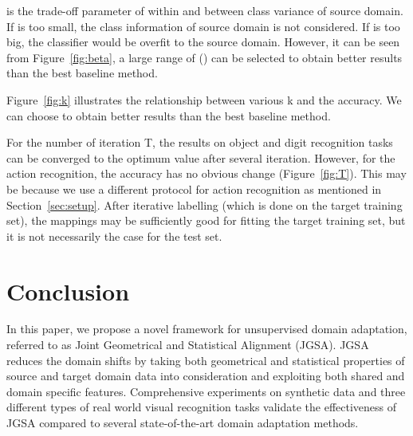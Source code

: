 \documentclass[10pt,twocolumn,letterpaper]{article}
\begin{document}
 is the trade-off parameter of within and between class variance of source domain. If  is too small, the class information of source domain is not considered. If  is too big, the classifier would be overfit to the source domain. However, it can be seen from Figure~\ref{fig:beta}, a large range of  () can be selected to obtain better results than the best baseline method.

Figure~\ref{fig:k} illustrates the relationship between various k and the accuracy.
We can choose  to obtain better results than the best baseline method.

For the number of iteration T, the results on object and digit recognition tasks can be converged to the optimum value after several iteration. However, for the action recognition, the accuracy has no obvious change (Figure~\ref{fig:T}). 
This may be because we use a different protocol for action recognition as mentioned in Section~\ref{sec:setup}. After iterative labelling (which is done on the target training set), the mappings may be sufficiently good for fitting the target training set, but it is not necessarily the case for the test set.



\vspace{-0.5em}
\section{Conclusion}
\vspace{-0.5em}
In this paper, we propose a novel framework for unsupervised domain adaptation, referred to as Joint Geometrical and Statistical Alignment (JGSA). JGSA reduces the domain shifts by taking both geometrical and statistical properties of source and target domain data into consideration and exploiting both shared and domain specific features. Comprehensive experiments on synthetic data and three different types of real world visual recognition tasks validate the effectiveness of JGSA compared to several state-of-the-art domain adaptation methods.




\begin{small}
 

\end{small}
\end{document}
